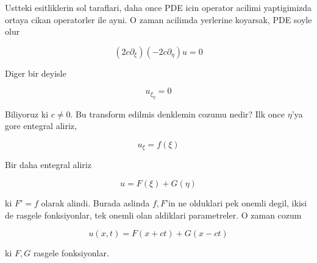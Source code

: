\documentclass[12pt,fleqn]{article}
\begin{document}
Ustteki esitliklerin sol taraflari, daha once PDE icin operator acilimi
yaptigimizda ortaya cikan operatorler ile ayni. O zaman acilimda yerlerine
koyarsak, PDE soyle olur

\[ (2c\partial_\xi)(-2c\partial_\eta)u = 0 \]

Diger bir deyisle 

\[ u_{\xi_\eta} = 0 \]

Biliyoruz ki $c \ne 0$. Bu transform edilmis denklemin cozumu nedir? Ilk
once $\eta$'ya gore entegral aliriz, 

\[ u_\xi = f(\xi) \]

Bir daha entegral aliriz

\[ u = F(\xi) + G(\eta) \]

ki $F' = f$ olarak alindi. Burada aslinda $f,F$'in ne olduklari pek onemli
degil, ikisi de rasgele fonksiyonlar, tek onemli olan aldiklari
parametreler. O zaman cozum 

\[ u(x,t) = F(x+ct) + G(x-ct) \]

ki $F,G$ rasgele fonksiyonlar. 
\end{document}
